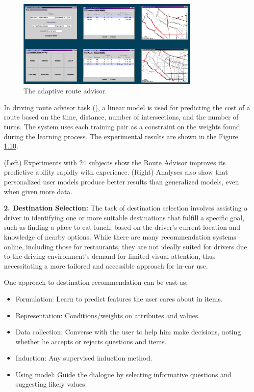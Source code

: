 \documentclass[
  letterpaper,
  DIV=11,
  numbers=noendperiod,
  oneside]{scrreprt}
\theoremstyle{remark}
\begin{document}
\begin{figure}

{\centering \includegraphics[width=0.8\textwidth,height=\textheight]{src/Figures/example-1.png}

}

\caption{The adaptive route advisor.}

\end{figure}%

In driving route advisor task (), a linear model is used for predicting the
cost of a route based on the time, distance, number of intersections,
and the number of turns. The system uses each training pair as a
constraint on the weights found during the learning process. The
experimental results are shown in the Figure \hyperref[fig:exp-2]{1.10}.

(Left) Experiments with 24 subjects show the Route Advisor improves its
predictive ability rapidly with experience. (Right) Analyses also show
that personalized user models produce better results than generalized
models, even when given more data.

\textbf{2. Destination Selection:} The task of destination selection
involves assisting a driver in identifying one or more suitable
destinations that fulfill a specific goal, such as finding a place to
eat lunch, based on the driver's current location and knowledge of
nearby options. While there are many recommendation systems online,
including those for restaurants, they are not ideally suited for drivers
due to the driving environment's demand for limited visual attention,
thus necessitating a more tailored and accessible approach for in-car
use.

One approach to destination recommendation can be cast as:

\begin{itemize}
\item
  Formulation: Learn to predict features the user cares about in items.
\item
  Representation: Conditions/weights on attributes and values.
\item
  Data collection: Converse with the user to help him make decisions,
  noting whether he accepts or rejects questions and items.
\item
  Induction: Any supervised induction method.
\item
  Using model: Guide the dialogue by selecting informative questions and
  suggesting likely values.
\end{itemize}
\end{document}
